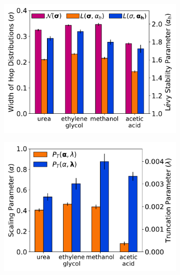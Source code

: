 \documentclass[journal=jctcce,manuscript=article]{achemso}
\begin{document}
  \begin{figure}
  \centering
  \begin{subfigure}{0.325\textwidth}
  \includegraphics[width=\textwidth]{1mode_AD_hops.pdf}
  \caption{}\label{fig:1mode_AD_hops}
  \end{subfigure}
  \begin{subfigure}{0.325\textwidth}
  \includegraphics[width=\textwidth]{1mode_AD_dwells.pdf}
  \caption{}\label{fig:1mode_AD_dwells}
  \end{subfigure}
  \begin{subfigure}{0.325\textwidth}

\end{subfigure}
\end{figure}
\end{document}
